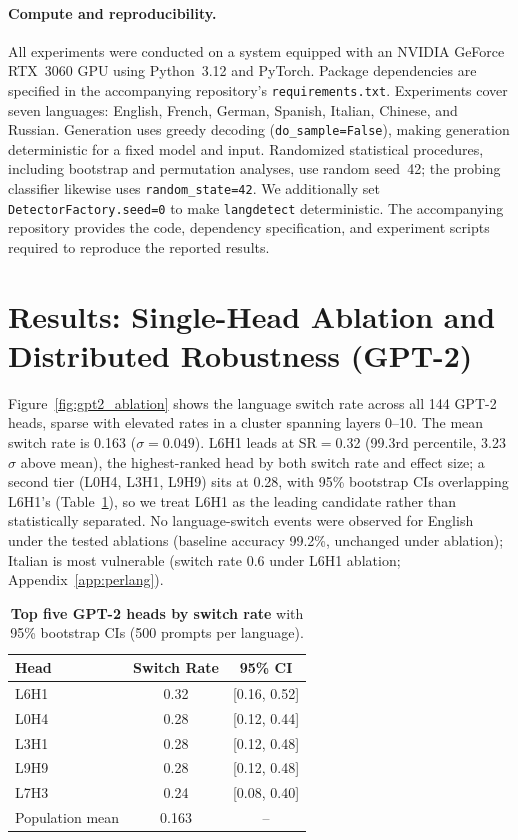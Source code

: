 \documentclass[11pt]{article}
\begin{document}
\paragraph{Compute and reproducibility.}
All experiments were conducted on a system equipped with an NVIDIA GeForce
RTX~3060 GPU using Python~3.12 and PyTorch. Package dependencies are specified
in the accompanying repository's \texttt{requirements.txt}. Experiments cover
seven languages: English, French, German, Spanish, Italian, Chinese, and
Russian. Generation uses greedy decoding (\texttt{do\_sample=False}), making
generation deterministic for a fixed model and input. Randomized statistical
procedures, including bootstrap and permutation analyses, use random seed~42;
the probing classifier likewise uses \texttt{random\_state=42}. We additionally
set \texttt{DetectorFactory.seed=0} to make \texttt{langdetect} deterministic.
The accompanying repository provides the code, dependency specification, and
experiment scripts required to reproduce the reported results.

\section{Results: Single-Head Ablation and Distributed Robustness (GPT-2)}
\label{sec:ablation}

Figure~\ref{fig:gpt2_ablation} shows the
language switch rate across all 144 GPT-2 heads, sparse with elevated
rates in a cluster spanning layers 0--10. The mean switch rate is 0.163
($\sigma{=}0.049$). L6H1 leads at SR$=$0.32 (99.3rd percentile,
3.23$\sigma$ above mean), the highest-ranked head by both switch rate
and effect size; a second tier (L0H4, L3H1, L9H9) sits at 0.28, with
95\% bootstrap CIs overlapping L6H1's (Table~\ref{tab:top_heads}), so we
treat L6H1 as the leading candidate rather than statistically separated.
No language-switch events were observed for English under the tested
ablations (baseline accuracy 99.2\%, unchanged under ablation);
Italian is most vulnerable (switch rate 0.6 under L6H1 ablation;
Appendix~\ref{app:perlang}).

\begin{table}[t]
\caption{\textbf{Top five GPT-2 heads by switch rate} with 95\%
bootstrap CIs (500 prompts per language).}
\label{tab:top_heads}
\centering\small
\begin{tabular}{lcc}
\toprule
\textbf{Head} & \textbf{Switch Rate} & \textbf{95\% CI} \\
\midrule
L6H1  & 0.32 & {[0.16, 0.52]} \\
L0H4  & 0.28 & {[0.12, 0.44]} \\
L3H1  & 0.28 & {[0.12, 0.48]} \\
L9H9  & 0.28 & {[0.12, 0.48]} \\
L7H3  & 0.24 & {[0.08, 0.40]} \\
\midrule
Population mean & 0.163 & -- \\
\bottomrule
\end{tabular}
\end{table}
\end{document}

